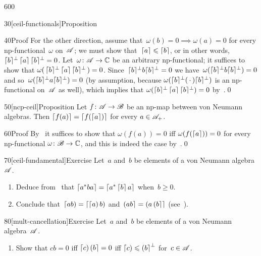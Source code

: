 \begin{parsec}{600}
\begin{point}{30}[ceil-functionals]{Proposition}
\begin{point}{40}{Proof}
For the other direction,
assume that~$\omega(b)=0\implies \omega(a)=0$
for every np-functional~$\omega$ on~$\mathscr{A}$;
we must show that~$\left\lceil a\right\rceil\leqslant \left\lceil b\right\rceil$,
or in other words, $\smash{\left\lceil b\right\rceil}^\perp \left\lceil a\right\rceil\smash{\left\lceil b\right\rceil}^\perp =0$.
Let~$\omega\colon \mathscr{A}\to\mathbb{C}$ be an arbitrary np-functional;
it suffices to show that 
$\omega(\,\smash{\left\lceil b\right\rceil}^\perp \left\lceil a\right\rceil\smash{\left\lceil b\right\rceil}^\perp \,)=0$.
Since~$\smash{\left\lceil b\right\rceil}^\perp b \smash{\left\lceil b\right\rceil}^\perp =0$
we have~$\omega(\smash{\left\lceil b\right\rceil}^\perp b\smash{\left\lceil b\right\rceil}^\perp)=0$
and so~$\omega(\smash{\left\lceil b\right\rceil}^\perp a \smash{\left\lceil b\right\rceil}^\perp)=0$
(by assumption, because
$\omega(\smash{\left\lceil b\right\rceil}^\perp(\,\cdot\,)\smash{\left\lceil b\right\rceil}^\perp)$
is an np-functional on~$\mathscr{A}$ as well),
which implies that
$\omega(\smash{\left\lceil b\right\rceil}^\perp\left\lceil a\right\rceil\smash{\left\lceil b\right\rceil}^\perp)=0$
by~.\qed
\end{point}
\end{point}
\begin{point}{50}[ncp-ceil]{Proposition}%
Let $f\colon \mathscr{A}\to\mathscr{B}$ be an np-map
between von Neumann algebras.
Then $\left\lceil f(a)\right\rceil=\left\lceil f(\left\lceil a\right\rceil)\right\rceil$
for every $a\in\mathscr{A}_+$.
\begin{point}{60}{Proof}%
By~
it suffices to show that
$\omega(f(a))=0$ iff $\omega(f(\left\lceil a\right\rceil))=0$
for every np-functional $\omega\colon \mathscr{B}\to\mathbb{C}$,
and this is indeed the case by~.\qed
\end{point}
\end{point}
\begin{point}{70}[ceil-fundamental]{Exercise}%
Let~$a$ and~$b$ be elements of a von Neumann algebra~$\mathscr{A}$.
\begin{enumerate}
\item
Deduce from~
that
$\left\lceil a^*ba\right\rceil = \left\lceil a^*\left\lceil b\right\rceil a\right\rceil$
when~$b\geq 0$.
\item
Conclude that~$\left\lceil ab\right)=\left\lceil\left\lceil a\right)b\right)$
and~$\left(ab\right\rceil=\left(a\left(b\right\rceil\right\rceil$
(see~).

\end{enumerate}
\end{point}
\begin{point}{80}[mult-cancellation]{Exercise}%
Let~$a$ and~$b$ be elements of a von Neumann algebra~$\mathscr{A}$.
\begin{enumerate}
\item
Show that $cb=0$ iff $\left\lceil c\right)\left(b\right\rceil=0$
iff $\left\lceil c\right)\leqslant \left(b\right\rceil^\perp$
for~$c\in\mathscr{A}$.


\end{enumerate}
\end{point}
\end{parsec}
